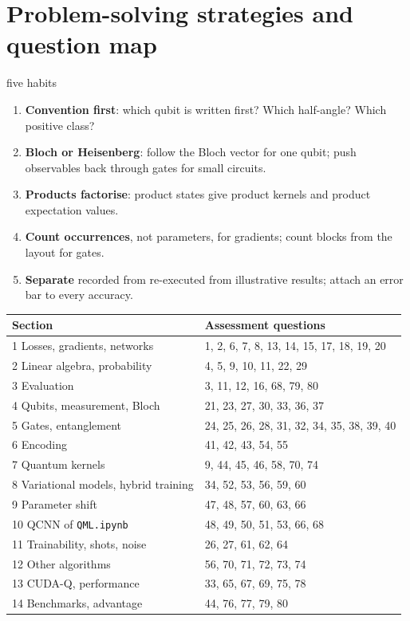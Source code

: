 \documentclass[11pt,a4paper,openany]{book}
\begin{document}
\section{Problem-solving strategies and question map}
\begin{method}{five habits}
\begin{enumerate}[itemsep=1pt]
\item \textbf{Convention first}: which qubit is written first? Which half-angle? Which positive class?
\item \textbf{Bloch or Heisenberg}: follow the Bloch vector for one qubit; push observables back through gates for small circuits.
\item \textbf{Products factorise}: product states give product kernels and product expectation values.
\item \textbf{Count occurrences}, not parameters, for gradients; count blocks from the layout for gates.
\item \textbf{Separate} recorded from re-executed from illustrative results; attach an error bar to every accuracy.
\end{enumerate}
\end{method}
\begin{center}\small
\begin{tabularx}{\linewidth}{@{}lX@{}}
\toprule Section & Assessment questions\\ \midrule
1 Losses, gradients, networks & 1, 2, 6, 7, 8, 13, 14, 15, 17, 18, 19, 20\\
2 Linear algebra, probability & 4, 5, 9, 10, 11, 22, 29\\
3 Evaluation & 3, 11, 12, 16, 68, 79, 80\\
4 Qubits, measurement, Bloch & 21, 23, 27, 30, 33, 36, 37\\
5 Gates, entanglement & 24, 25, 26, 28, 31, 32, 34, 35, 38, 39, 40\\
6 Encoding & 41, 42, 43, 54, 55\\
7 Quantum kernels & 9, 44, 45, 46, 58, 70, 74\\
8 Variational models, hybrid training & 34, 52, 53, 56, 59, 60\\
9 Parameter shift & 47, 48, 57, 60, 63, 66\\
10 QCNN of \texttt{QML.ipynb} & 48, 49, 50, 51, 53, 66, 68\\
11 Trainability, shots, noise & 26, 27, 61, 62, 64\\
12 Other algorithms & 56, 70, 71, 72, 73, 74\\
13 CUDA-Q, performance & 33, 65, 67, 69, 75, 78\\
14 Benchmarks, advantage & 44, 76, 77, 79, 80\\ \bottomrule
\end{tabularx}
\end{center}
\end{document}
